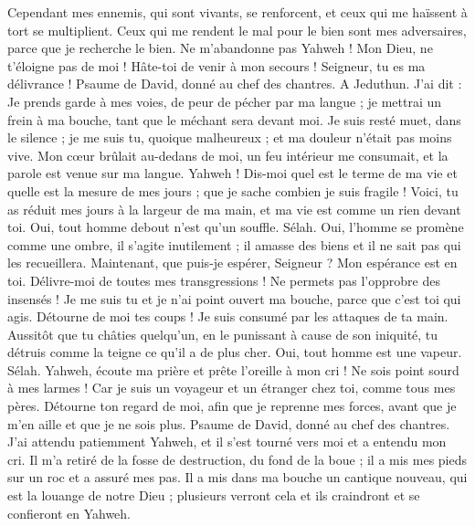 \begin{multicols}{2}
Cependant mes ennemis, qui sont vivants, se renforcent, et ceux qui me haïssent à tort se multiplient.
Ceux qui me rendent le mal pour le bien sont mes adversaires, parce que je recherche le bien.
Ne m'abandonne pas Yahweh ! Mon Dieu, ne t'éloigne pas de moi !
Hâte-toi de venir à mon secours ! Seigneur, tu es ma délivrance !
\VerseOne{}Psaume de David, donné au chef des chantres. A Jeduthun.
J'ai dit : Je prends garde à mes voies, de peur de pécher par ma langue ; je mettrai un frein à ma bouche, tant que le méchant sera devant moi.
Je suis resté muet, dans le silence ; je me suis tu, quoique malheureux ; et ma douleur n'était pas moins vive.
Mon cœur brûlait au-dedans de moi, un feu intérieur me consumait, et la parole est venue sur ma langue.
Yahweh ! Dis-moi quel est le terme de ma vie et quelle est la mesure de mes jours ; que je sache combien je suis fragile !
Voici, tu as réduit mes jours à la largeur de ma main, et ma vie est comme un rien devant toi. Oui, tout homme debout n'est qu'un souffle. Sélah.
Oui, l'homme se promène comme une ombre, il s'agite inutilement ; il amasse des biens et il ne sait pas qui les recueillera.
Maintenant, que puis-je espérer, Seigneur ? Mon espérance est en toi.
Délivre-moi de toutes mes transgressions ! Ne permets pas l'opprobre des insensés !
Je me suis tu et je n'ai point ouvert ma bouche, parce que c'est toi qui agis.
Détourne de moi tes coups ! Je suis consumé par les attaques de ta main.
Aussitôt que tu châties quelqu'un, en le punissant à cause de son iniquité, tu détruis comme la teigne ce qu'il a de plus cher. Oui, tout homme est une vapeur. Sélah.
Yahweh, écoute ma prière et prête l'oreille à mon cri ! Ne sois point sourd à mes larmes ! Car je suis un voyageur et un étranger chez toi, comme tous mes pères.
Détourne ton regard de moi, afin que je reprenne mes forces, avant que je m'en aille et que je ne sois plus.
\VerseOne{}Psaume de David, donné au chef des chantres.
J'ai attendu patiemment Yahweh, et il s'est tourné vers moi et a entendu mon cri.
Il m'a retiré de la fosse de destruction, du fond de la boue ; il a mis mes pieds sur un roc et a assuré mes pas.
Il a mis dans ma bouche un cantique nouveau, qui est la louange de notre Dieu ; plusieurs verront cela et ils craindront et se confieront en Yahweh.

\end{multicols}
